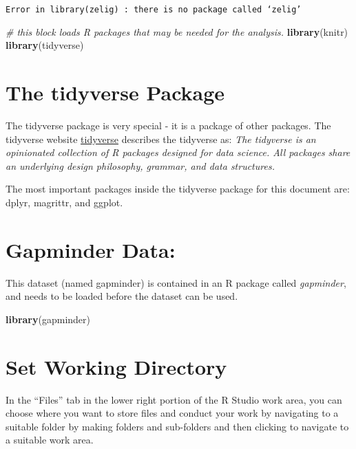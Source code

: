 \documentclass[]{book}
\newenvironment{Shaded}{\begin{snugshade}}{\end{snugshade}}
\newcommand{\KeywordTok}[1]{\textcolor[rgb]{0.13,0.29,0.53}{\textbf{#1}}}
\newcommand{\CommentTok}[1]{\textcolor[rgb]{0.56,0.35,0.01}{\textit{#1}}}
\newcommand{\NormalTok}[1]{#1}
\begin{document}
\texttt{Error\ in\ library(zelig)\ :\ there\ is\ no\ package\ called\ ‘zelig’}

\begin{Shaded}
\begin{Highlighting}[]
\CommentTok{# this block loads R packages that may be needed for the analysis.}
\KeywordTok{library}\NormalTok{(knitr)}
\KeywordTok{library}\NormalTok{(tidyverse)}
\end{Highlighting}
\end{Shaded}

\section{The tidyverse Package}\label{the-tidyverse-package}

The tidyverse package is very special - it is a package of other
packages. The tidyverse website \href{http://tidyverse.org}{tidyverse}
describes the tidyverse as: \emph{The tidyverse is an opinionated
collection of R packages designed for data science. All packages share
an underlying design philosophy, grammar, and data structures.}

The most important packages inside the tidyverse package for this
document are: dplyr, magrittr, and ggplot.

\section{Gapminder Data:}\label{gapminder-data}

This dataset (named gapminder) is contained in an R package called
\emph{gapminder}, and needs to be loaded before the dataset can be used.

\begin{Shaded}
\begin{Highlighting}[]
\KeywordTok{library}\NormalTok{(gapminder)}
\end{Highlighting}
\end{Shaded}

\section{Set Working Directory}\label{set-working-directory}

In the ``Files'' tab in the lower right portion of the R Studio work
area, you can choose where you want to store files and conduct your work
by navigating to a suitable folder by making folders and sub-folders and
then clicking to navigate to a suitable work area.
\end{document}
